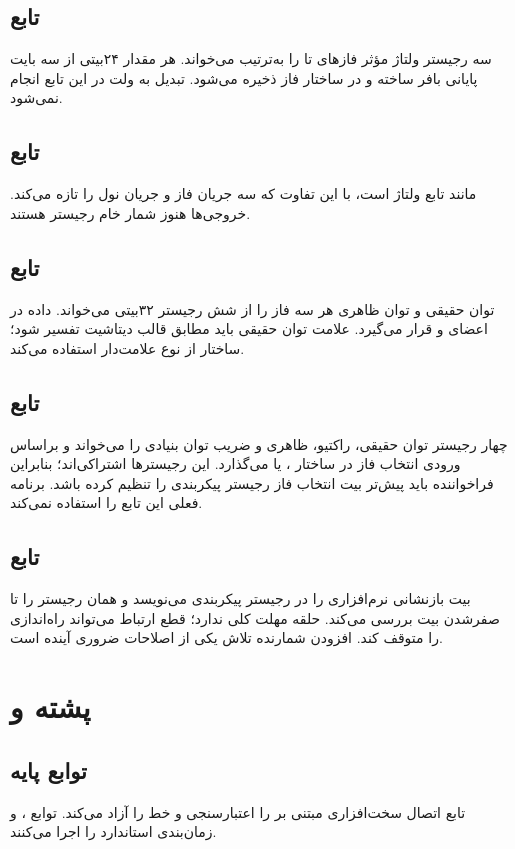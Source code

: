 \subsection{تابع }
سه رجیستر ولتاژ مؤثر فازهای
تا
را به‌ترتیب می‌خواند. هر مقدار ۲۴بیتی از سه بایت پایانی بافر ساخته و در ساختار فاز ذخیره می‌شود. تبدیل به ولت در این تابع انجام نمی‌شود.

\subsection{تابع }
مانند تابع ولتاژ است، با این تفاوت که سه جریان فاز و جریان نول را تازه می‌کند. خروجی‌ها هنوز شمار خام رجیستر هستند.

\subsection{تابع }
توان حقیقی و توان ظاهری هر سه فاز را از شش رجیستر ۳۲بیتی می‌خواند. داده در اعضای
و
قرار می‌گیرد. علامت توان حقیقی باید مطابق قالب دیتاشیت تفسیر شود؛ ساختار از نوع علامت‌دار استفاده می‌کند.

\subsection{تابع }
چهار رجیستر توان حقیقی، راکتیو، ظاهری و ضریب توان بنیادی را می‌خواند و براساس ورودی انتخاب فاز در ساختار
،
یا
می‌گذارد. این رجیسترها اشتراکی‌اند؛ بنابراین فراخواننده باید پیش‌تر بیت انتخاب فاز رجیستر پیکربندی را تنظیم کرده باشد. برنامه فعلی این تابع را استفاده نمی‌کند.

\subsection{تابع }
بیت بازنشانی نرم‌افزاری را در رجیستر پیکربندی می‌نویسد و همان رجیستر را تا صفرشدن بیت بررسی می‌کند. حلقه مهلت کلی ندارد؛ قطع ارتباط
می‌تواند راه‌اندازی را متوقف کند. افزودن شمارنده تلاش یکی از اصلاحات ضروری آینده است.

\section{پشته  و }

\subsection{توابع پایه }
تابع  اتصال سخت‌افزاری مبتنی بر  را اعتبارسنجی و خط را آزاد می‌کند. توابع ،  و  زمان‌بندی استاندارد را اجرا می‌کنند.

